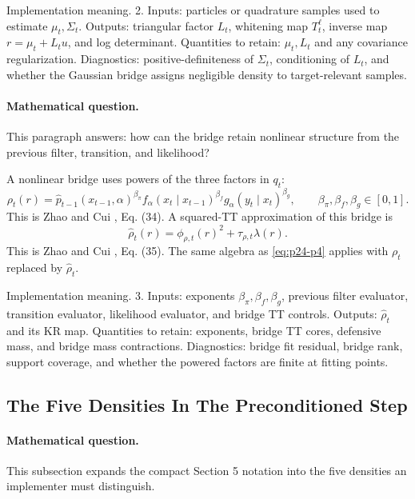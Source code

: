 \documentclass[11pt]{article}
\numberwithin{equation}{section}
\begin{document}
Implementation meaning. 2.  Inputs: particles or quadrature samples used
to estimate \(\mu_t,\Sigma_t\).  Outputs: triangular factor \(L_t\), whitening
map \(T_t^\ell\), inverse map \(r=\mu_t+L_tu\), and log determinant.  Quantities
to retain: \(\mu_t,L_t\) and any covariance regularization.  Diagnostics:
positive-definiteness of \(\Sigma_t\), conditioning of \(L_t\), and whether the
Gaussian bridge assigns negligible density to target-relevant samples.

\paragraph{Mathematical question.}
This paragraph answers: how can the bridge retain nonlinear structure from
the previous filter, transition, and likelihood?

A nonlinear bridge uses powers of the three factors in \(q_t\):
\begin{equation}
    \rho_t(r)
    =
    \widehat p_{t-1}(x_{t-1},\alpha)^{\beta_\pi}
    f_\alpha(x_t\mid x_{t-1})^{\beta_f}
    g_\alpha(y_t\mid x_t)^{\beta_g},
    \qquad
    \beta_\pi,\beta_f,\beta_g\in[0,1].
    \label{eq:p24-p6}
\end{equation}
This is Zhao and Cui \cite{zhao2024ttsequential}, Eq. (34).  A squared-TT approximation of this bridge is
\begin{equation}
    \widehat\rho_t(r)
    =
    \phi_{\rho,t}(r)^2+\tau_{\rho,t}\lambda(r).
    \label{eq:p24-p7}
\end{equation}
This is Zhao and Cui \cite{zhao2024ttsequential}, Eq. (35).  The same algebra as \eqref{eq:p24-p4} applies with
\(\rho_t\) replaced by \(\widehat\rho_t\).

Implementation meaning. 3.  Inputs: exponents
\(\beta_\pi,\beta_f,\beta_g\), previous filter evaluator, transition evaluator,
likelihood evaluator, and bridge TT controls.  Outputs: \(\widehat\rho_t\) and
its KR map.  Quantities to retain: exponents, bridge TT cores, defensive mass, and
bridge mass contractions.  Diagnostics: bridge fit residual, bridge rank,
support coverage, and whether the powered factors are finite at fitting points.

\subsection{The Five Densities In The Preconditioned Step}

\paragraph{Mathematical question.}
This subsection expands the compact Section 5 notation into the five densities
an implementer must distinguish.
\end{document}
